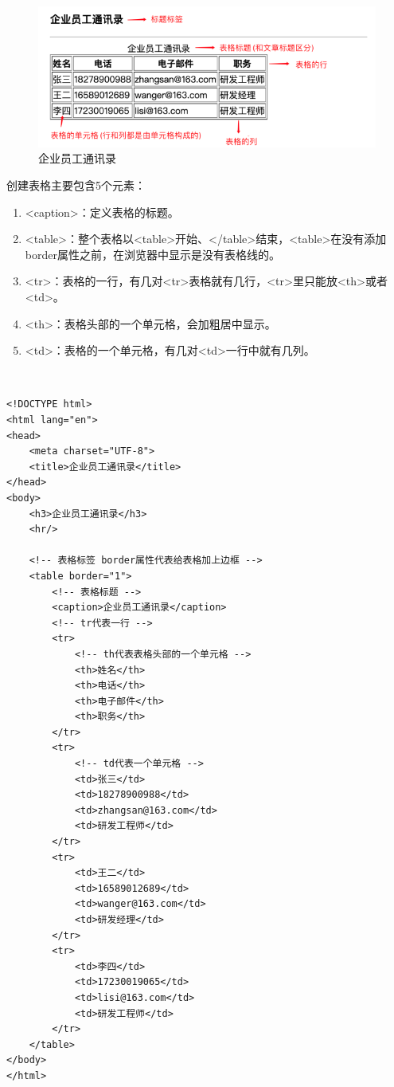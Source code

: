 \begin{figure}[H]
	\centering
	\includegraphics[scale=0.9]{img/C4/4-1/1.png}
	\caption{企业员工通讯录}
\end{figure}

创建表格主要包含5个元素：

\begin{enumerate}
	\item <caption>：定义表格的标题。

	\item <table>：整个表格以<table>开始、</table>结束，<table>在没有添加border属性之前，在浏览器中显示是没有表格线的。

	\item <tr>：表格的一行，有几对<tr>表格就有几行，<tr>里只能放<th>或者<td>。

	\item <th>：表格头部的一个单元格，会加粗居中显示。

	\item <td>：表格的一个单元格，有几对<td>一行中就有几列。
\end{enumerate}

\vspace{0.5cm}

\\

\begin{lstlisting}[style=htmlcssjs]
<!DOCTYPE html>
<html lang="en">
<head>
    <meta charset="UTF-8">
    <title>企业员工通讯录</title>
</head>
<body>
    <h3>企业员工通讯录</h3>
    <hr/>

    <!-- 表格标签 border属性代表给表格加上边框 -->
    <table border="1">
        <!-- 表格标题 -->
        <caption>企业员工通讯录</caption>
        <!-- tr代表一行 -->
        <tr>
            <!-- th代表表格头部的一个单元格 -->
            <th>姓名</th>
            <th>电话</th>
            <th>电子邮件</th>
            <th>职务</th>
        </tr>
        <tr>
            <!-- td代表一个单元格 -->
            <td>张三</td>
            <td>18278900988</td>
            <td>zhangsan@163.com</td>
            <td>研发工程师</td>
        </tr>
        <tr>
            <td>王二</td>
            <td>16589012689</td>
            <td>wanger@163.com</td>
            <td>研发经理</td>
        </tr>
        <tr>
            <td>李四</td>
            <td>17230019065</td>
            <td>lisi@163.com</td>
            <td>研发工程师</td>
        </tr>
    </table>
</body>
</html>
\end{lstlisting}

